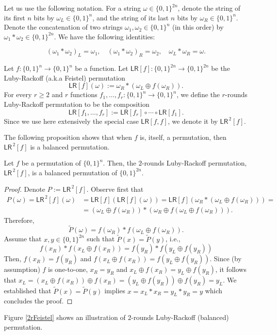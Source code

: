 \documentclass{llncs}
\newcommand{\s}{\{0,1\}}
\newcommand{\tx}{\textsf}
\begin{document}
Let us use the following notation. For a string $\omega\in\s^{2n}$, denote the string of its first $n$ bits by $\omega_L\in\s^n$, and the string of its last $n$ bits by $\omega_R\in\s^n$. Denote the concatenation of two strings $\omega_1,\omega_2\in\s^n$ (in this order) by $\omega_1*\omega_2\in\s^{2n}$. We have the following identities:

\begin{equation*}
\left(\omega_1*\omega_2\right)_L=\omega_1,\quad\left(\omega_1*\omega_2\right)_R=\omega_2,\quad \omega_L*\omega_R=\omega.
\end{equation*}
\begin{definition}
Let $f:\s^n\rightarrow\s^n$ be a function. Let $\tx{LR}[f]:\s^{2n}\rightarrow\s^{2n}$ be the Luby-Rackoff (a.k.a Feistel) permutation
\begin{equation}\label{feistel}
\tx{LR}[f](\omega) :=\omega_R*\left(\omega_L\oplus f(\omega_R)\right).
\end{equation}
For every $r\geq 2$ and $r$ functions $f_1, \ldots, f_r: \s^n \rightarrow \s^n$, we define the $r$-rounds Luby-Rackoff permutation to be the composition
$$\tx{LR}[f_1, \ldots, f_r] :=\tx{LR}[f_r]\circ \cdots \circ\tx{LR}[f_1].$$
Since we use here extensively the special case $\tx{LR}[f, f]$, we denote it by $\tx{LR}^{\,2}[f]$.
\end{definition}

The following proposition shows that when $f$ is, itself, a permutation, then $\tx{LR}^{\,2}[f]$ is a balanced permutation.

\begin{proposition}
Let $f$ be a permutation of $\s^n$. Then, the $2$-rounds Luby-Rackoff permutation, $\tx{LR}^{\,2}[f]$, is a balanced permutation of $\s^{2n}$.
\label{2_Feistel_Rounds}
\end{proposition}

\begin{proof} Denote $P:=\tx{LR}^{\,2}[f]$. Observe first that
\begin{align}P(\omega)=\tx{LR}^{\,2}[f](\omega)&=\tx{LR}[f]\left(\tx{LR}[f](\omega)\right)=\tx{LR}[f]\left(\omega_R*\left(\omega_L\oplus f(\omega_R)\right)\right)=\nonumber\\
&=\left(\omega_L\oplus f(\omega_R)\right)*\left(\omega_R\oplus f\left(\omega_L\oplus f(\omega_R)\right)\right).\label{feistel2}
\end{align}
Therefore,
$$\tilde{P}(\omega)=f(\omega_R)* f\left(\omega_L\oplus f(\omega_R)\right).$$
Assume that $x,y\in\s^{2n}$ such that $\tilde{P}(x)=\tilde{P}(y)$, i.e.,
$$f(x_R)* f\left(x_L\oplus f(x_R)\right)=f(y_R)* f\left(y_L\oplus f(y_R)\right)$$
Then, $f(x_R)=f(y_R)$ and $f\left(x_L\oplus f(x_R)\right)=f\left(y_L\oplus f(y_R)\right)$.
Since (by assumption) $f$ is one-to-one, $x_R=y_R$ and $x_L\oplus f(x_R)=y_L\oplus f(y_R)$, it follows that
$x_L=\left(x_L\oplus f(x_R)\right)\oplus f(x_R)=\left(y_L\oplus f(y_R)\right)\oplus f(y_R)=y_L$.
We established that $\tilde{P}(x)=\tilde{P}(y)$ implies $x=x_L*x_R=y_L*y_R=y$ which concludes the proof.
\end{proof}
Figure \ref{2rFeistel} shows an illustration of $2$-rounds Luby-Rackoff (balanced) permutation.
\end{document}

